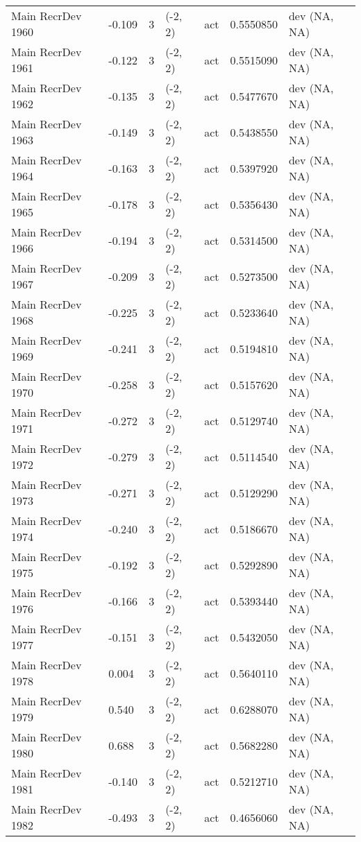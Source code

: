 \documentclass[11pt,
  english,
  a4paper,
]{article}
\begin{document}
\begin{landscape}
\begin{longtable}[t]{>{\raggedright\arraybackslash}p{6cm}lllll>{\raggedright\arraybackslash}p{4cm}}
Main RecrDev 1960 & -0.109 & 3 & (-2, 2) & act & 0.5550850 & dev (NA, NA)\\
Main RecrDev 1961 & -0.122 & 3 & (-2, 2) & act & 0.5515090 & dev (NA, NA)\\
Main RecrDev 1962 & -0.135 & 3 & (-2, 2) & act & 0.5477670 & dev (NA, NA)\\
Main RecrDev 1963 & -0.149 & 3 & (-2, 2) & act & 0.5438550 & dev (NA, NA)\\
Main RecrDev 1964 & -0.163 & 3 & (-2, 2) & act & 0.5397920 & dev (NA, NA)\\
Main RecrDev 1965 & -0.178 & 3 & (-2, 2) & act & 0.5356430 & dev (NA, NA)\\
Main RecrDev 1966 & -0.194 & 3 & (-2, 2) & act & 0.5314500 & dev (NA, NA)\\
Main RecrDev 1967 & -0.209 & 3 & (-2, 2) & act & 0.5273500 & dev (NA, NA)\\
Main RecrDev 1968 & -0.225 & 3 & (-2, 2) & act & 0.5233640 & dev (NA, NA)\\
Main RecrDev 1969 & -0.241 & 3 & (-2, 2) & act & 0.5194810 & dev (NA, NA)\\
Main RecrDev 1970 & -0.258 & 3 & (-2, 2) & act & 0.5157620 & dev (NA, NA)\\
Main RecrDev 1971 & -0.272 & 3 & (-2, 2) & act & 0.5129740 & dev (NA, NA)\\
Main RecrDev 1972 & -0.279 & 3 & (-2, 2) & act & 0.5114540 & dev (NA, NA)\\
Main RecrDev 1973 & -0.271 & 3 & (-2, 2) & act & 0.5129290 & dev (NA, NA)\\
Main RecrDev 1974 & -0.240 & 3 & (-2, 2) & act & 0.5186670 & dev (NA, NA)\\
Main RecrDev 1975 & -0.192 & 3 & (-2, 2) & act & 0.5292890 & dev (NA, NA)\\
Main RecrDev 1976 & -0.166 & 3 & (-2, 2) & act & 0.5393440 & dev (NA, NA)\\
Main RecrDev 1977 & -0.151 & 3 & (-2, 2) & act & 0.5432050 & dev (NA, NA)\\
Main RecrDev 1978 & 0.004 & 3 & (-2, 2) & act & 0.5640110 & dev (NA, NA)\\
Main RecrDev 1979 & 0.540 & 3 & (-2, 2) & act & 0.6288070 & dev (NA, NA)\\
Main RecrDev 1980 & 0.688 & 3 & (-2, 2) & act & 0.5682280 & dev (NA, NA)\\
Main RecrDev 1981 & -0.140 & 3 & (-2, 2) & act & 0.5212710 & dev (NA, NA)\\
Main RecrDev 1982 & -0.493 & 3 & (-2, 2) & act & 0.4656060 & dev (NA, NA)\\

\end{longtable}
\end{landscape}
\end{document}
